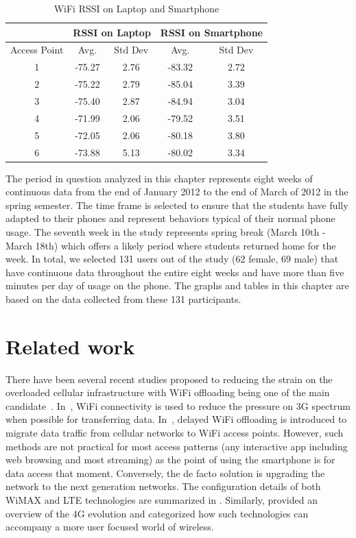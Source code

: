 \begin{table}[h!tbp] 
\caption{WiFi RSSI on Laptop and Smartphone} 
\label{table:diff_rssi}
\centering 
\begin{tabular}{|c|c|c|c|c|}
\hline
& \multicolumn{2}{c|}{RSSI on Laptop} & \multicolumn{2}{c|}{RSSI on Smartphone} \\
\hline Access Point & Avg. & Std Dev & Avg. & Std Dev \\
\hline 1 & -75.27 & 2.76 & -83.32 & 2.72  \\ 
\hline 2 & -75.22 & 2.79 & -85.04 & 3.39 \\
\hline 3 & -75.40 & 2.87 & -84.94 & 3.04\\
\hline 4 & -71.99 & 2.06 & -79.52 & 3.51\\
\hline 5 & -72.05 & 2.06 & -80.18 & 3.80\\
\hline 6 & -73.88 & 5.13 & -80.02 & 3.34\\
\hline
\end{tabular}
\end{table}

The period in question analyzed in
this chapter represents eight weeks of continuous data from the end of January 2012 to the end of March of 2012 in the spring semester. The time frame is selected to ensure that the students have fully adapted to 
their phones and represent behaviors typical of their normal phone usage.  The seventh week in the study 
represents spring break (March 10th - March 18th) which offers a likely period where students returned home
for the week. In total, we selected 131 users out of the study (62 female, 69 male) that have continuous data throughout the
entire eight weeks and have more than five minutes per day of usage on the phone. The graphs and tables in this chapter are based on the data collected from these 131 participants. 

\section{Related work}\label{related}
There have been several recent studies proposed to reducing the strain on the overloaded cellular infrastructure with WiFi offloading being one of the main candidate~\cite{balasubramanian2010augmenting,lee2010mobile,dimatteo2011cellular,icc2012performance,han2011mobile}. In~\cite{balasubramanian2010augmenting}, WiFi connectivity is used to reduce the pressure on 3G spectrum when possible for transferring data. In~\cite{lee2010mobile,dimatteo2011cellular,icc2012performance,han2011mobile}, delayed WiFi offloading is introduced to migrate data traffic from cellular networks to WiFi access points. However, such methods are not practical for most access patterns (any interactive app including web browsing and most streaming) as the point of using the smartphone is for data access that moment. Conversely, the de facto solution is upgrading the network to the next generation networks. The configuration details of both WiMAX and LTE technologies are summarized in \cite{khan20094g}. Similarly, \cite{arshad2010evolution} provided an overview of the 4G evolution and categorized how such technologies can accompany a more user focused world of wireless. 


